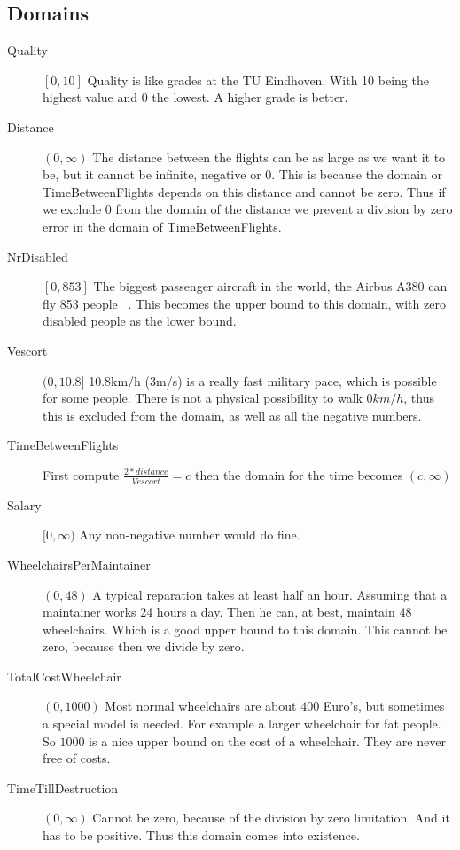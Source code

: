 \documentclass[a4paper, 11pt, notitlepage]{report}
\begin{document}
\subsection{Domains}
	\begin{description}
		\item[Quality] $[0,10]$ Quality is like grades at the TU Eindhoven. With 10 being the highest value and 0 the lowest. A higher grade is better.
		\item[Distance] $(0,\infty)$ The distance between the flights can be as large as we want it to be, but it cannot be infinite, negative or 0. This is because the domain or TimeBetweenFlights depends on this distance and cannot be zero. Thus if we exclude 0 from the domain of the distance we prevent a division by zero error in the domain of TimeBetweenFlights.
		\item[NrDisabled] $[0,853 ]$ The biggest passenger aircraft in the world, the Airbus A380 can fly 853 people ~\cite{ref3}. This becomes the upper bound to this domain, with zero disabled people as the lower bound.   %
		\item[Vescort] $(0,10.8]$ 10.8km/h (3m/s) is a really fast military pace, which is possible for some people. There is not a physical possibility to walk $0km/h$, thus this is excluded from the domain, as well as all the negative numbers.
		\item[TimeBetweenFlights] First compute $\frac{2*distance}{Vescort} = c$ then the domain for the time becomes $(c,\infty)$ %
		\item[Salary] $[0,\infty)$ Any non-negative number would do fine.
		\item[WheelchairsPerMaintainer] $(0,48)$ A typical reparation takes at least half an hour. Assuming that a maintainer works 24 hours a day. Then he can, at best, maintain 48 wheelchairs. Which is a good upper bound to this domain. This cannot be zero, because then we divide by zero.
		\item[TotalCostWheelchair] $(0,1000)$ Most normal wheelchairs are about $400$ Euro's, but sometimes a special model is needed. For example a larger wheelchair for fat people. So $1000$ is a nice upper bound on the cost of a wheelchair. They are never free of costs. %
		\item[TimeTillDestruction] $(0,\infty)$ Cannot be zero, because of the division by zero limitation. And it has to be positive. Thus this domain comes into existence.
	\end{description}
	
\end{document}
